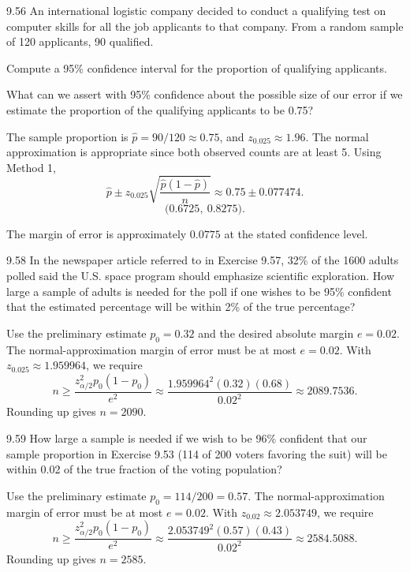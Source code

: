 \documentclass[11pt,oneside]{article}
\begin{document}
\begin{exercise}{9.56}
An international logistic company decided to conduct a qualifying test on computer skills for all the job applicants to that company. From a random sample of 120 applicants, 90 qualified.
\begin{exercisesubparts}
\item Compute a 95\% confidence interval for the proportion of qualifying applicants.
\item What can we assert with 95\% confidence about the possible size of our error if we estimate the proportion of the qualifying applicants to be 0.75?
\end{exercisesubparts}
\end{exercise}
\begin{solution}
\begin{exercisesubparts}
\item The sample proportion is $\hat p=90/120\approx0.75$, and $z_{0.025}\approx1.96$. The normal approximation is appropriate since both observed counts are at least 5. Using Method 1,
\[
\hat p\pm z_{0.025}\sqrt{\frac{\hat p(1-\hat p)}{n}}\approx0.75\pm 0.077474.
\]
\[
\boxed{\bigl(0.6725,\ 0.8275\bigr)}.
\]

\item The margin of error is approximately $\boxed{0.0775}$ at the stated confidence level.
\end{exercisesubparts}
\end{solution}

\begin{exercise}{9.58}
In the newspaper article referred to in Exercise 9.57, 32\% of the 1600 adults polled said the U.S. space program should emphasize scientific exploration. How large a sample of adults is needed for the poll if one wishes to be 95\% confident that the estimated percentage will be within 2\% of the true percentage?
\end{exercise}
\begin{solution}
Use the preliminary estimate $p_0=0.32$ and the desired absolute margin $e=0.02$. The normal-approximation margin of error must be at most $e=0.02$. With $z_{0.025}\approx 1.959964$, we require
\[
n\ge \frac{z_{\alpha/2}^2p_0(1-p_0)}{e^2}\approx \frac{1.959964^2(0.32)(0.68)}{0.02^2}\approx 2089.7536.
\]
Rounding up gives $\boxed{n=2090}$.
\end{solution}

\begin{exercise}{9.59}
How large a sample is needed if we wish to be 96\% confident that our sample proportion in Exercise 9.53 (114 of 200 voters favoring the suit) will be within 0.02 of the true fraction of the voting population?
\end{exercise}
\begin{solution}
Use the preliminary estimate $p_0=114/200=0.57$. The normal-approximation margin of error must be at most $e=0.02$. With $z_{0.02}\approx 2.053749$, we require
\[
n\ge \frac{z_{\alpha/2}^2p_0(1-p_0)}{e^2}\approx \frac{2.053749^2(0.57)(0.43)}{0.02^2}\approx 2584.5088.
\]
Rounding up gives $\boxed{n=2585}$.
\end{solution}
\end{document}
